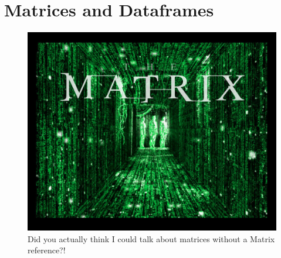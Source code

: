 \documentclass[]{book}
\theoremstyle{definition}
\theoremstyle{definition}
\theoremstyle{remark}
\begin{document}
\chapter{Matrices and Dataframes}\label{matricesdataframes}

\begin{figure}

{\centering \includegraphics[width=0.5\linewidth]{images/matrix} 

}

\caption{Did you actually think I could talk about matrices without a Matrix reference?!}\label{fig:unnamed-chunk-183}
\end{figure}
\end{document}
